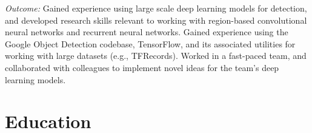 \documentclass[10pt,letterpaper]{article}
\begin{document}
\begin{itemize}
	{\it Outcome:} Gained experience using large scale deep learning models for detection, and developed research skills relevant to working with region-based convolutional neural networks and recurrent neural networks. Gained experience using the Google Object Detection codebase, TensorFlow, and its associated utilities for working with large datasets (e.g., TFRecords). Worked in a fast-paced team, and collaborated with colleagues to implement novel ideas for the team's deep learning models.

\end{itemize}


\vspace{-1.5em}
\section{Education}
\vspace{-0.5em}
\end{document}
